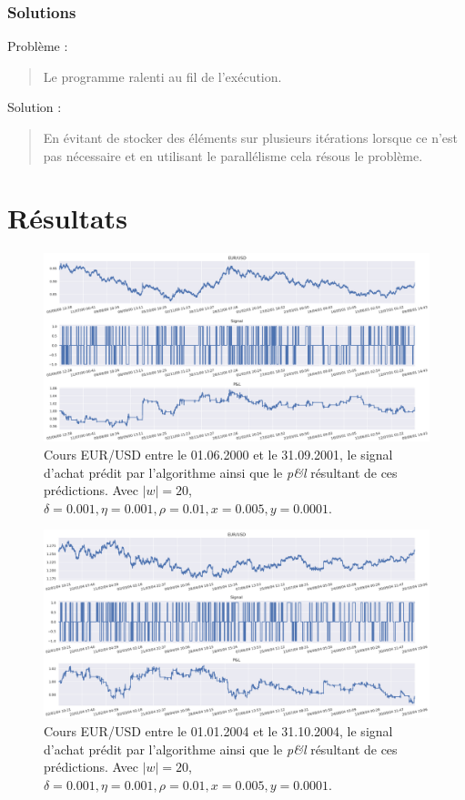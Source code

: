 \documentclass{beamer}
\begin{document}
	\begin{frame}
		\frametitle{Solutions}
		Problème :
		\begin{quote}
			Le programme ralenti au fil de l'exécution.
		\end{quote}
		
		Solution :
		\begin{quote}
			En évitant de stocker des éléments sur plusieurs itérations lorsque ce n'est pas nécessaire et en utilisant le parallélisme cela résous le problème.
		\end{quote}
	\end{frame}
	
	\section{Résultats}

	\begin{frame}
		\begin{figure}
			\includegraphics[scale=0.275]{../Rapport/res/eursud_2000-2001}
			\caption[Blup]{Cours EUR/USD entre le 01.06.2000 et le 31.09.2001, le signal d'achat prédit par l'algorithme ainsi que le \textit{p\&l} résultant de ces prédictions. Avec $|w| = 20$, $\delta = 0.001, \eta=0.001,\rho=0.01, x = 0.005, y=0.0001$.}
		\end{figure}
	\end{frame}

	\begin{frame}
		\begin{figure}
			\includegraphics[scale=0.275]{../Rapport/res/eurusd_2004-2005}				\caption[Blup]{Cours EUR/USD entre le 01.01.2004 et le 31.10.2004, le signal d'achat prédit par l'algorithme ainsi que le \textit{p\&l} résultant de ces prédictions. Avec $|w| = 20$, $\delta = 0.001, \eta=0.001,\rho=0.01, x = 0.005, y=0.0001$.}
		\end{figure}
	\end{frame}
\end{document}

